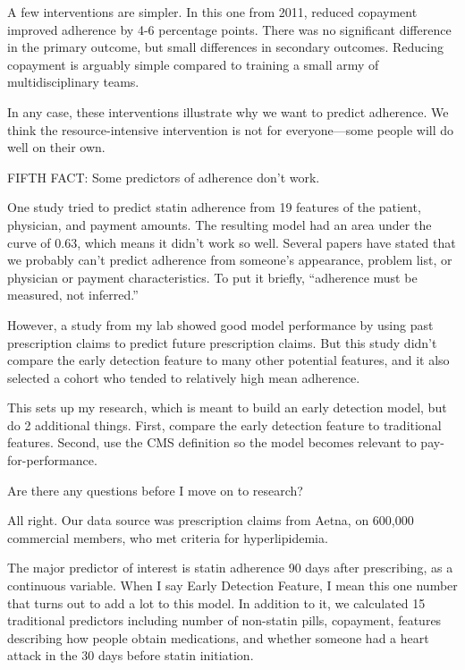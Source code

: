 \documentclass[12pt]{report}
\begin{document}
\begin{large}
A few interventions are simpler. In this one from 2011, reduced copayment
improved adherence by 4-6 percentage points. There was no significant
difference in the primary outcome, but small differences in secondary
outcomes. Reducing copayment is arguably simple compared to training a
small army of multidisciplinary teams. %

In any case, these interventions illustrate why we want to predict
adherence. We think the resource-intensive intervention is not for
everyone---some people will do well on their own.

FIFTH FACT: Some predictors of adherence don't work. %

One study tried to predict statin adherence from 19 features of the
patient, physician, and payment amounts. The resulting model had an
area under the curve of 0.63, which means it didn't work so well.
Several papers have stated that we probably can't predict adherence
from someone's appearance, problem list, or physician or payment
characteristics. To put it briefly, ``adherence must be measured, not
inferred.'' %

However, a study from my lab showed good model performance
by using past prescription claims to predict future prescription
claims. But this study didn't compare the early detection feature to
many other potential features, and it also selected a cohort who
tended to relatively high mean adherence. %

This sets up my research, which is meant to build an early detection
model, but do 2 additional things. First, compare the early detection
feature to traditional features. Second, use the CMS definition so the
model becomes relevant to pay-for-performance.

Are there any questions before I move on to research?







All right. Our data source was prescription claims from Aetna, on
600,000 commercial members, who met criteria for hyperlipidemia. %

The major predictor of interest is statin adherence 90 days after
prescribing, as a continuous variable. When I say Early Detection
Feature, I mean this one number that turns out to add a lot to this
model. In addition to it, we calculated 15 traditional predictors
including number of non-statin pills, copayment, features describing
how people obtain medications, and whether someone had a heart attack
in the 30 days before statin initiation.


\end{large}
\end{document}
